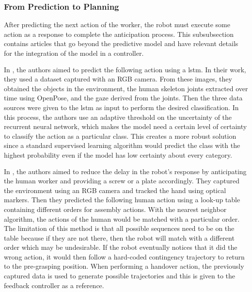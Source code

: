 \subsubsection{From Prediction to Planning}

After predicting the next action of the worker, the robot must execute some action as a response to complete the anticipation process. This subsubsection contains articles that go beyond the predictive model and have relevant details for the integration of the model in a controller.

In \textcite{Canuto2021}, the authors aimed to predict the following action using a \acs{lstm}. In their work, they used a dataset captured with an RGB camera. From these images, they obtained the objects in the environment, the human skeleton joints extracted over time using OpenPose, and the gaze derived from the joints. Then the three data sources were given to the \acs{lstm} as input to perform the desired classification. In this process, the authors use an adaptive threshold on the uncertainty of the recurrent neural network, which makes the model need a certain level of certainty to classify the action as a particular class. This creates a more robust solution since a standard supervised learning algorithm would predict the class with the highest probability even if the model has low certainty about every category.

In \textcite{Maeda2016}, the authors aimed to reduce the delay in the robot's response by anticipating the human worker and providing a screw or a plate accordingly. They captured the environment using an RGB camera and tracked the hand using optical markers. Then they predicted the following human action using a look-up table containing different orders for assembly actions. With the nearest neighbor algorithm, the actions of the human would be matched with a particular order. The limitation of this method is that all possible sequences need to be on the table because if they are not there, then the robot will match with a different order which may be undesirable. If the robot eventually notices that it did the wrong action, it would then follow a hard-coded contingency trajectory to return to the pre-grasping position. When performing a handover action, the previously captured data is used to generate possible trajectories and this is given to the feedback controller as a reference.

